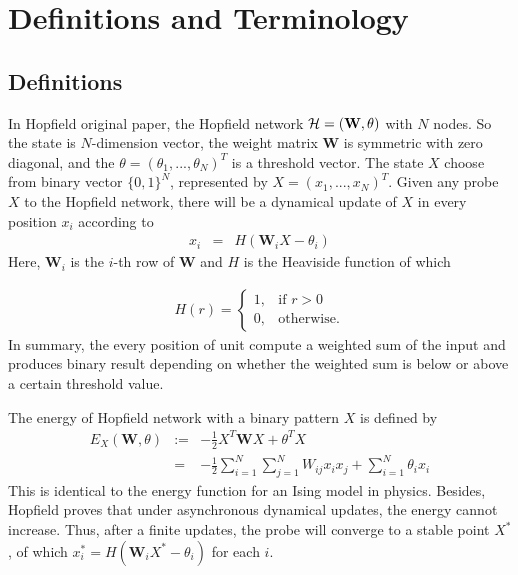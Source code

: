 \section{Definitions and Terminology}
\subsection{Definitions}


In Hopfield original paper, the Hopfield network $\cal{H} = (\textbf{W}, \theta)$ with $N$ nodes. 
So the state is $N$-dimension vector, the weight matrix $\textbf{W}$ is symmetric with zero diagonal, and the $\theta = (\theta_1,...,\theta_N)^T$ is a threshold vector. 
The state $X$ choose from binary vector $\{0, 1\}^N$, represented by $X = (x_1, ..., x_N)^T$. 
Given any probe $X$ to the Hopfield network, there will be a dynamical update of $X$ in every position $x_i$ according to
\begin{eqnarray*}
  x_i &=& H(\textbf{W}_iX - \theta_i)
\end{eqnarray*}
Here, $\textbf{W}_i$ is the $i$-th row of $\textbf{W}$ and $H$ is the Heaviside function of which

\begin{eqnarray*}
  H(r) = 
  \begin{cases}
    1, & \mbox{if $r > 0$} \\
    0, & \mbox{otherwise}.
  \end{cases}
\end{eqnarray*}
In summary, the every position of unit compute a weighted sum of the input and produces binary result depending on whether the weighted sum is below or above a certain threshold value.

The energy of Hopfield network with a binary pattern $X$ is defined by
\begin{eqnarray*}
  E_X(\textbf{W}, \theta) &:=& -\frac{1}{2}X^T\textbf{W}X + \theta^TX \\
  &=& -\frac{1}{2}\sum_{i=1}^{N} \sum_{j=1}^{N} W_{ij}x_ix_j + \sum_{i=1}^{N} \theta_ix_i
\end{eqnarray*}
This is identical to the energy function for an Ising model in physics. 
Besides, Hopfield proves that under asynchronous dynamical updates, the energy cannot increase. 
Thus, after a finite updates, the probe will converge to a stable point $X^*$, of which $x_i^* = H(\textbf{W}_iX^* - \theta_i)$ for each $i$.

